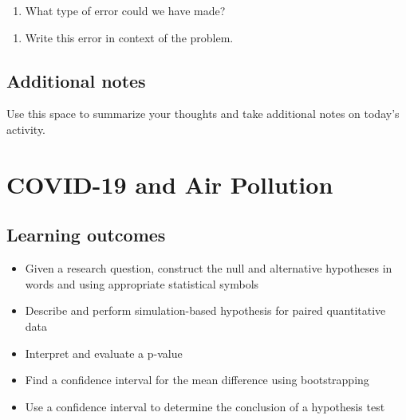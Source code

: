 \documentclass[
]{report}
\providecommand{\tightlist}{%
  \setlength{\itemsep}{0pt}\setlength{\parskip}{0pt}}
\begin{document}
\begin{enumerate}
\def\labelenumi{\arabic{enumi}.}
\setcounter{enumi}{26}
\tightlist
\item
  What type of error could we have made?
\end{enumerate}

\vspace{0.5in}

\begin{enumerate}
\def\labelenumi{\arabic{enumi}.}
\setcounter{enumi}{27}
\tightlist
\item
  Write this error in context of the problem.
\end{enumerate}

\vspace{1in}

\hypertarget{additional-notes}{%
\section{Additional notes}\label{additional-notes}}

Use this space to summarize your thoughts and take additional notes on today's activity.

\hypertarget{covid-19-and-air-pollution}{%
\chapter{COVID-19 and Air Pollution}\label{covid-19-and-air-pollution}}

\hypertarget{learning-outcomes}{%
\section{Learning outcomes}\label{learning-outcomes}}

\begin{itemize}
\item
  Given a research question, construct the null and alternative hypotheses
  in words and using appropriate statistical symbols
\item
  Describe and perform simulation-based hypothesis for paired quantitative data
\item
  Interpret and evaluate a p-value
\item
  Find a confidence interval for the mean difference using bootstrapping
\item
  Use a confidence interval to determine the conclusion of a hypothesis test
\end{itemize}
\end{document}
